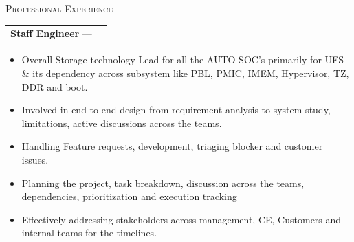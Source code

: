 \documentclass[10pt, a4paper]{article}
\makeatletter
\newcommand{\cventry}[3]{%
  \noindent
  \begin{tabularx}{\linewidth}{@{}X r@{}}
    \textbf{#1} --- \textit{#2} & \textcolor{lightgray}{\small #3}
  \end{tabularx}
  \vspace{2pt}
}
\newcommand{\clientinfo}[2]{%
  \noindent\textcolor{lightgray}{\small\textit{#1:}}\enspace#2\par
}
\newcommand{\MainHeading}[1]{%
    {\noindent \color{ltgrey}\normalsize{\textsc {#1}}}\vspace{2pt}}%
\makeatother
\begin{document}
\MainHeading{Professional Experience}\newline%
\cventry{Staff Engineer}{\CompanyV{}}{\CompanyVExp{}}
\vspace{-1.5em}%
\begin{itemize}[label={-}, leftmargin=*, topsep=0pt, partopsep=0pt, itemsep=0pt, parsep=0pt] %
   \item Overall Storage technology Lead for all the AUTO SOC’s primarily for UFS \& its dependency across subsystem like PBL, PMIC, IMEM, Hypervisor, TZ, DDR and boot.
   \item Involved in end-to-end design from requirement analysis to system study, limitations, active discussions across the teams.
   \item Handling Feature requests, development, triaging blocker and customer issues.
   \item Planning the project, task breakdown, discussion across the teams, dependencies, prioritization and execution tracking
   \item Effectively addressing stakeholders across management, CE, Customers and internal teams for the timelines.
\end{itemize}
\end{document}
